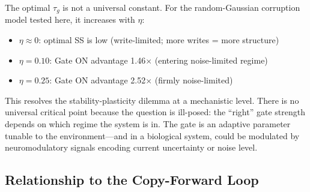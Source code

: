 \documentclass[11pt,twocolumn]{article}
\begin{document}
The optimal $\tau_g$ is not a universal constant.
For the random-Gaussian corruption model tested here, it increases with $\eta$:
\begin{itemize}
  \item $\eta \approx 0$: optimal SS is low (write-limited; more writes = more structure)
  \item $\eta = 0.10$: Gate ON advantage 1.46$\times$ (entering noise-limited regime)
  \item $\eta = 0.25$: Gate ON advantage 2.52$\times$ (firmly noise-limited)
\end{itemize}

This resolves the stability-plasticity dilemma at a mechanistic level.
There is no universal critical point because the question is ill-posed:
the ``right'' gate strength depends on which regime the system is in.
The gate is an adaptive parameter tunable to the environment---and in a biological
system, could be modulated by neuromodulatory signals encoding current
uncertainty or noise level.

\subsection{Relationship to the Copy-Forward Loop}
\end{document}
